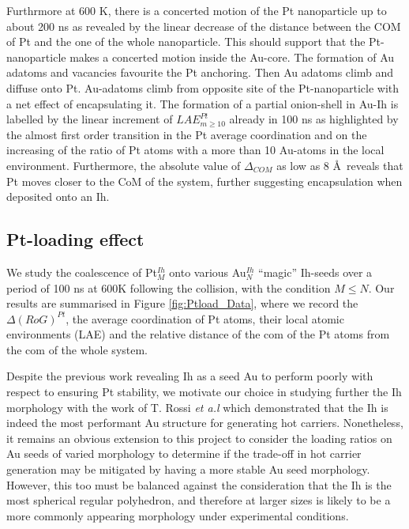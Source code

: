 Furthrmore at 600 K, there is a concerted motion of the Pt nanoparticle up to about 200 ns as revealed by the linear decrease of the distance between the COM of Pt and the one of the whole nanoparticle. This should support that the Pt-nanoparticle makes a concerted motion inside the Au-core. The formation of Au adatoms and vacancies favourite the Pt anchoring. Then Au adatoms climb and diffuse onto Pt. Au-adatoms climb from opposite site of the Pt-nanoparticle with a net effect of encapsulating it.
 The formation of a partial onion-shell in Au-Ih is labelled by the linear increment of $LAE^{Pt}_{m\geq10}$ already in 100 ns as highlighted by the almost first order transition in the Pt average coordination and on the increasing of the ratio of Pt atoms with a more than 10 Au-atoms in the local environment. Furthermore, the absolute value of $\Delta_{COM}$ as low as 8 \AA \ reveals that Pt moves closer to the CoM of the system, further suggesting encapsulation when deposited onto an Ih.

%
\subsection{Pt-loading effect}
We study the coalescence of Pt$_{M}^{Ih}$ onto various Au$_{N}^{Ih}$ ``magic'' Ih-seeds over a period of 100 ns at 600K following the collision, with the condition $M\leq N$. Our results are summarised in Figure \ref{fig:Ptload_Data}, where we record the $\Delta (RoG)^{Pt}$, the average coordination of Pt atoms, their local atomic environments (LAE) and the relative distance of the com of the Pt atoms from the com of the whole system.

Despite the previous work revealing Ih as a seed Au to perform poorly with respect to ensuring Pt stability, we motivate our choice in studying further the Ih morphology with the work of T. Rossi \textit{et a.l} \cite{TRossi2020} which demonstrated that the Ih is indeed the most performant Au structure for generating hot carriers. Nonetheless, it remains an obvious extension to this project to consider the loading ratios on Au seeds of varied morphology to determine if the trade-off in hot carrier generation may be mitigated by having a more stable Au seed morphology. However, this too must be balanced against the consideration that the Ih is the most spherical regular polyhedron, and therefore at larger sizes is likely to be a more commonly appearing morphology under experimental conditions.

